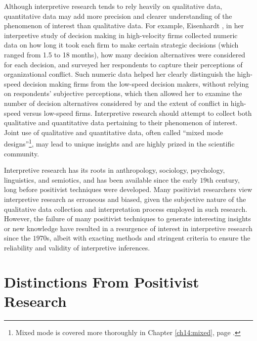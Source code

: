 Although interpretive research tends to rely heavily on qualitative data, quantitative data may add more precision and clearer understanding of the phenomenon of interest than qualitative data. For example, Eisenhardt \cite{eisenhardt1989making}, in her interpretive study of decision making in high-velocity firms collected numeric data on how long it took each firm to make certain strategic decisions (which ranged from 1.5 to 18 months), how many decision alternatives were considered for each decision, and surveyed her respondents to capture their perceptions of organizational conflict. Such numeric data helped her clearly distinguish the high-speed decision making firms from the low-speed decision makers, without relying on respondents' subjective perceptions, which then allowed her to examine the number of decision alternatives considered by and the extent of conflict in high-speed versus low-speed firms. Interpretive research should attempt to collect both qualitative and quantitative data pertaining to their phenomenon of interest. Joint use of qualitative and quantitative data, often called ``mixed mode designs''\footnote{Mixed mode is covered more thoroughly in Chapter \ref{ch14:mixed}, page \pageref{ch14:mixed}.}, may lead to unique insights and are highly prized in the scientific community.

Interpretive research has its roots in anthropology, sociology, psychology, linguistics, and \gls{semiotics}, and has been available since the early $ 19 $th century, long before positivist techniques were developed. Many positivist researchers view interpretive research as erroneous and biased, given the subjective nature of the qualitative data collection and interpretation process employed in such research. However, the failure of many positivist techniques to generate interesting insights or new knowledge have resulted in a resurgence of interest in interpretive research since the $ 1970 $s, albeit with exacting methods and stringent criteria to ensure the reliability and validity of interpretive inferences.

\section{Distinctions From Positivist Research}

